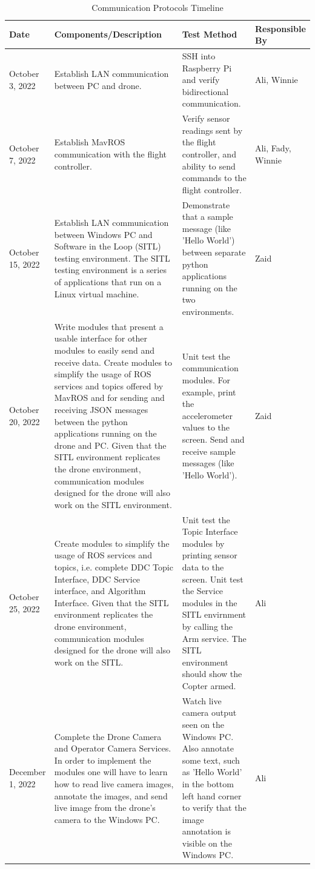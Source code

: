 \documentclass[12pt, titlepage]{article}
\begin{document}
\begin{table}[!h]
\begin{center}
\caption {Communication Protocols Timeline}
\label{tab:commTimeline}
\begin{tabular}{ | m{1.7cm} | m{6.7cm} | m{4.6cm} | m{2cm} | } 
\hline
Date & Components/Description & Test Method & Responsible By \\
\hline
October 3, 2022 & Establish LAN communication between PC and drone. & 
    SSH into Raspberry Pi and verify bidirectional communication. & Ali, Winnie \\
\hline
October 7, 2022 & Establish MavROS communication with the flight controller. & 
    Verify sensor readings sent by the flight controller, and ability to send commands to the flight controller. & Ali, Fady, Winnie \\
\hline
October 15, 2022 & Establish LAN communication between Windows PC and Software in the Loop (SITL) testing environment. The SITL testing environment is a series of applications that run on a Linux virtual machine. & 
    Demonstrate that a sample message (like 'Hello World') between separate python applications running on the two environments. & Zaid \\
\hline
October 20, 2022 & Write modules that present a usable interface for other modules to easily send and receive data. 
    Create modules to simplify the usage of ROS services and topics offered by MavROS and for sending and receiving JSON messages between the python applications running on the drone and PC. Given that the SITL environment replicates the drone environment, communication modules designed for the drone will also work on the SITL environment. & 
    Unit test the communication modules. For example, print the accelerometer values to the screen. Send and receive sample messages (like 'Hello World'). & Zaid \\
\hline
October 25, 2022 & Create modules to simplify the usage of ROS services and topics, i.e. complete DDC Topic Interface, DDC Service interface, and Algorithm Interface. Given that the SITL environment replicates the drone environment, communication modules designed for the drone will also work on the SITL.  & 
    Unit test the Topic Interface modules by printing sensor data to the screen. Unit test the Service modules in the SITL envirnment by calling the Arm service. The SITL environment should show the Copter armed.  & Ali \\
\hline
December 1, 2022 & Complete the Drone Camera and Operator Camera Services. In order to implement the modules one will have to learn how to read live camera images, annotate the images, and send live image from the drone's camera to the Windows PC. & 
    Watch live camera output seen on the Windows PC. Also annotate some text, such as 'Hello World' in the bottom left hand corner to verify that the image annotation is visible on the Windows PC. & Ali \\
\hline
\end{tabular}
\end{center}
\end{table}
\end{document}
